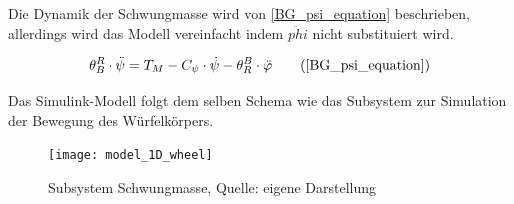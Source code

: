 Die Dynamik der Schwungmasse wird von \ref{BG_psi_equation} beschrieben, allerdings wird das Modell vereinfacht indem $\ddot{phi}$ nicht substituiert wird.

\begin{equation}
{\theta}^R_B \cdot \ddot{\psi} = T_M - C_{\psi} \cdot \dot{\psi} - {\theta}^B_R \cdot \ddot{\varphi}\tag{\ref{BG_psi_equation}}
\end{equation}

Das Simulink-Modell folgt dem selben Schema wie das Subsystem zur Simulation der Bewegung des Würfelkörpers.

\begin{figure}[h]
\label{Simulink_1DModell_Wheel_pic}
\texttt{[image: model\_1D\_wheel]}
\caption{Subsystem Schwungmasse, Quelle: eigene Darstellung}
\end{figure}
